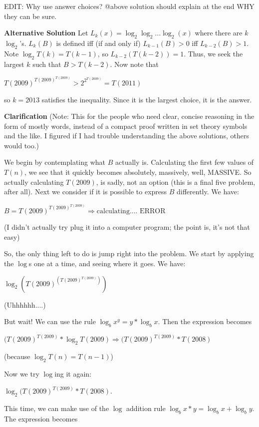\begin{enumerate}
 EDIT: Why use answer choices? @above solution should explain at the end WHY they can be sure.

 \textbf{Alternative Solution} Let $L_k(x)=\log_2\log_2...\log_2(x)$ where there are $k$ $\log_2$'s. $L_k(B)$ is defined iff (if and only if) $L_{k-1}(B) > 0$ iff $L_{k-2}(B) > 1$. Note $\log_2 T(k) = T(k - 1)$, so $L_{k-2}(T(k-2))=1$. Thus, we seek the largest $k$ such that $B > T(k-2)$. Now note that

 $T(2009)^{T(2009)^{T(2009)}} > 2^{2^{T(2009)}} = T(2011)$

 so $k=2013$ satisfies the inequality. Since it is the largest choice, it is the answer.

 \textbf{Clarification} (Note: This for the people who need clear, concise reasoning in the form of mostly words, instead of a compact proof written in set theory symbols and the like. I figured if I had trouble understanding the above solutions, others would too.)

 
We begin by contemplating what $B$ actually is. Calculating the first few values of $T(n)$, we see that it quickly becomes absolutely, massively, well, MASSIVE. So actually calculating $T(2009)$, is sadly, not an option (this is a final five problem, after all). Next we consider if it is possible to express $B$ differently. We have:

 
$B = T(2009)^{T(2009)^{T(2009)}} \Rightarrow \text{calculating.... ERROR}$

 
(I didn't actually try plug it into a computer program; the point is, it's not that easy)

 So, the only thing left to do is jump right into the problem. We start by applying the $\log$s one at a time, and seeing where it goes. We have:

 
$\log_2{\left(T(2009)^{\left(T(2009)^{T(2009)}\right)}\right)}$

 
(Uhhhhhh....)

 But wait! We can use the rule $\log_b{x^y} = y*\log_b{x}$. Then the expression becomes

 
$(T(2009)^{T(2009)}*\log_2{T(2009)} \Rightarrow (T(2009)^{T(2009)}*T(2008)$

 
(because $\log_2{T(n)} = {T(n-1)}$)

 Now we try $\log$ing it again:

 
$\log_2{(T(2009)^{T(2009)}*T(2008)}$.

 
This time, we can make use of the $\log$ addition rule $\log_b{x*y} = \log_b{x}+\log_b{y}$. The expression becomes


\end{enumerate}
